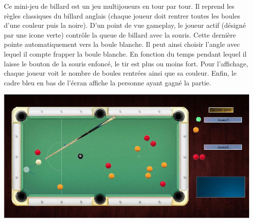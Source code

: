 \begin{minipage}{9cm}
Ce mini-jeu de billard est un jeu multijoueurs en tour par tour. 
Il reprend les règles classiques du billard anglais (chaque joueur doit rentrer toutes les boules d’une couleur puis la noire). 
D’un point de vue gameplay, le joueur actif (désigné par une icone verte) contrôle la queue de billard avec la souris. Cette dernière pointe automatiquement vers la boule blanche. 
Il peut ainsi choisir l’angle avec lequel il compte frapper la boule blanche. En fonction du temps pendant lequel
 il laisse le bouton de la souris enfoncé, le tir est plus ou moins fort. 
Pour l’affichage, chaque joueur voit le nombre de boules rentrées ainsi que sa couleur. 
Enfin, le cadre bleu en bas de l’écran affiche la personne ayant gagné la partie.
\end{minipage}
\hfill
\begin{minipage}{6cm}
 \includegraphics[width=\linewidth]{img/capturejeu_billard}
\end{minipage}


